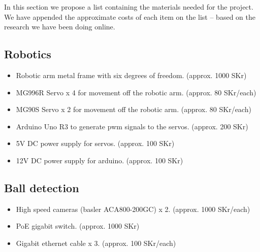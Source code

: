 \label{sec:equipment}
In this section we propose a list containing the materials needed for the project. We have appended the approximate costs of each item on the list -- based on the research we have been doing online.
\subsection{Robotics}
    \begin{itemize}
        \item Robotic arm metal frame with six degrees of freedom. (approx. 1000 SKr)
        \item MG996R Servo x 4 for movement off the robotic arm. (approx. 80 SKr/each)
        \item MG90S Servo x 2 for movement off the robotic arm. (approx. 80 SKr/each)
        \item Arduino Uno R3 to generate pwm signals to the servos. (approx. 200 SKr)
        \item 5V DC power supply for servos. (approx. 100 SKr)
        \item 12V DC power supply for arduino. (approx. 100 SKr)
    \end{itemize}
\subsection{Ball detection}
    \begin{itemize}
        \item High speed cameras (basler ACA800-200GC) x 2. (approx. 1000 SKr/each)
        \item PoE gigabit switch. (approx. 1000 SKr)
        \item Gigabit ethernet cable x 3. (approx. 100 SKr/each)
    \end{itemize}
